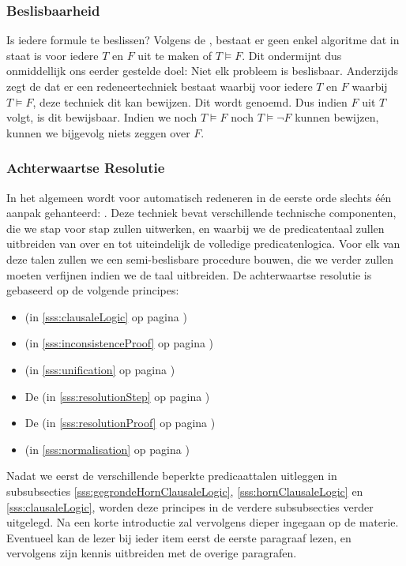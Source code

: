 \subsubsection{Beslisbaarheid}
Is iedere formule te beslissen? Volgens de , bestaat er geen enkel algoritme dat in staat is voor iedere $T$ en $F$ uit te maken of $T\vDash F$. Dit ondermijnt dus onmiddellijk ons eerder gestelde doel: Niet elk probleem is beslisbaar. Anderzijds zegt de  dat er een redeneertechniek bestaat waarbij voor iedere $T$ en $F$ waarbij $T\vDash F$, deze techniek dit kan bewijzen. Dit wordt  genoemd. Dus indien $F$ uit $T$ volgt, is dit bewijsbaar. Indien we noch $T\vDash F$ noch $T\vDash \neg F$ kunnen bewijzen, kunnen we bijgevolg niets zeggen over $F$.
\subsubsection{Achterwaartse Resolutie}
In het algemeen wordt voor automatisch redeneren in de eerste orde slechts \'e\'en aanpak gehanteerd: . Deze techniek bevat verschillende technische componenten, die we stap voor stap zullen uitwerken, en waarbij we de predicatentaal zullen uitbreiden van  over  en  tot uiteindelijk de volledige predicatenlogica. Voor elk van deze talen zullen we een semi-beslisbare procedure bouwen, die we verder zullen moeten verfijnen indien we de taal uitbreiden. De achterwaartse resolutie is gebaseerd op de volgende principes:
\begin{itemize}
 \item {} (in \ref{sss:clausaleLogic} op pagina \pageref{sss:clausaleLogic})
 \item {} (in \ref{sss:inconsistenceProof} op pagina \pageref{sss:inconsistenceProof})
 \item {} (in \ref{sss:unification} op pagina \pageref{sss:unification})
 \item De  (in \ref{sss:resolutionStep} op pagina \pageref{sss:resolutionStep})
 \item De  (in \ref{sss:resolutionProof} op pagina \pageref{sss:resolutionProof})
 \item {} (in \ref{sss:normalisation} op pagina \pageref{sss:normalisation})
\end{itemize}
Nadat we eerst de verschillende beperkte predicaattalen uitleggen in subsubsecties \ref{sss:gegrondeHornClausaleLogic}, \ref{sss:hornClausaleLogic} en \ref{sss:clausaleLogic}, worden
deze principes in de  verdere subsubsecties verder uitgelegd. Na een korte introductie zal vervolgens dieper ingegaan op de materie. Eventueel kan de lezer bij ieder item eerst de eerste paragraaf lezen, en vervolgens zijn kennis uitbreiden met de overige paragrafen.
